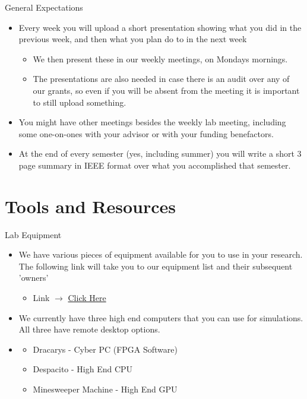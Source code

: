\documentclass[handout]{beamer}
\begin{document}
\begin{frame}{General Expectations}
\begin{itemize}
  \item Every week you will upload a short presentation showing what you did in the previous week, and then what you plan do to in the next week 
  \begin{itemize}
      \item We then present these in our weekly meetings, on Mondays mornings. 
      \item The presentations are also needed in case there is an audit over any of our grants, so even if you will be absent from the meeting it is important to still upload something.
  \end{itemize}
  \item You might have other meetings besides the weekly lab meeting, including some one-on-ones with your advisor or with your funding benefactors.
  \item At the end of every semester (yes, including summer) you will write a short 3 page summary in IEEE format over what you accomplished that semester. 
\end{itemize}
\end{frame}

\section{Tools and Resources}
\begin{frame}{Lab Equipment}
\begin{itemize}
  \item We have various pieces of equipment available for you to use in your research. The following link will take you to our equipment list and their subsequent 'owners'
  \begin{itemize}
      \item Link $\rightarrow$ \href{https://mailuc-my.sharepoint.com/:x:/g/personal/jones2a5_mail_uc_edu/EXBe2QP-OvxGii-G5BHZC_cBd0Yh-bm_f038cyp-A_TBMQ?e=vjvvBS}{Click Here}
  \end{itemize}
  \item We currently have three high end computers that you can use for simulations. All three have remote desktop options.
  \item \begin{itemize}
      \item Dracarys - Cyber PC (FPGA Software)
      \item Despacito - High End CPU
      \item Minesweeper Machine - High End GPU 
  \end{itemize}
\end{itemize}
\end{frame}
\end{document}

